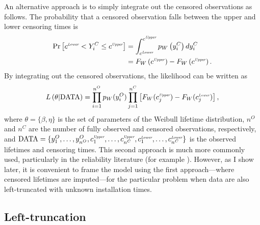An alternative approach is to simply integrate out the censored observations as follows. The probability that a censored observation falls between the upper and lower censoring times is
\begin{align*}
    \label{eq:integrate-out-cens}
    \text{Pr}\left[c^{\textit{\tiny{Lower}}} < Y^C_i \leq c^{\textit{\tiny{Upper}}}\right] & = \int_{c^{\textit{\tiny{Lower}}}}^{c^{\textit{\tiny{Upper}}}} p_W\left(y^C_i\right) d y^C_i \\
    & = F_W\left(c^{\textit{\tiny{Upper}}}\right) - F_W\left(c^{\textit{\tiny{Upper}}}\right).
\end{align*}
By integrating out the censored observations, the likelihood can be written as
\begin{equation}
    \label{eq:censored_likelihood}
    L\left(\theta|\text{DATA}\right) = \prod^{n^O}_{i = 1}p_W(y^O_i)
    \prod^{n^C}_{j = 1}\left[F_W(c^{\textit{\tiny{Upper}}}_j) - F_W(c^{\textit{\tiny{Lower}}}_j)\right],
\end{equation}
where $\theta = \{\beta, \eta\}$ is the set of parameters of the Weibull lifetime distribution, $n^O$ and $n^C$ are the number of fully observed and censored observations, respectively, and $\text{DATA} = \{y^O_1, 
\dots, y^O_{n^O}, c^{\textit{\tiny{Upper}}}_1, \dots, c^{\textit{\tiny{Upper}}}_{n^C}, c^{\textit{\tiny{Lower}}}_1, \dots, c^{\textit{\tiny{Lower}}}_{n^C}\}$ is the observed lifetimes and censoring times. This second approach is much more commonly used, particularly in the reliability literature (for example \citet{Meeker2022,tian2024,hong2009,mittman2013}). However, as I show later, it is convenient to frame the model using the first approach---where censored lifetimes are imputed---for the particular problem when data are also left-truncated with unknown installation times.

\subsection{Left-truncation}

